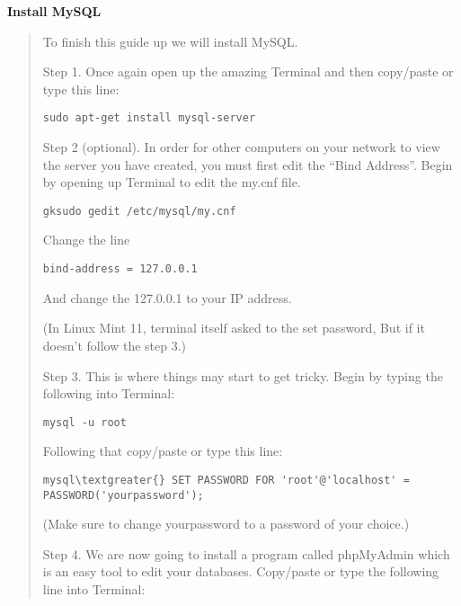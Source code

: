 \documentclass[letterpaper,10pt,english]{sphinxmanual}
\begin{document}
\textbf{Install MySQL}
\begin{quote}

To finish this guide up we will install MySQL.

Step 1. Once again open up the amazing Terminal and then copy/paste or type this line:

\begin{Verbatim}[commandchars=\\\{\}]
sudo apt-get install mysql-server
\end{Verbatim}

Step 2 (optional). In order for other computers on your network to view the server you have created, you must first
edit the ``Bind Address''. Begin by opening up Terminal to edit the my.cnf file.

\begin{Verbatim}[commandchars=\\\{\}]
gksudo gedit /etc/mysql/my.cnf
\end{Verbatim}

Change the line

\begin{Verbatim}[commandchars=\\\{\}]
bind-address = 127.0.0.1
\end{Verbatim}

And change the 127.0.0.1 to your IP address.

(In Linux Mint 11, terminal itself asked to the set password, But if it doesn't follow the step 3.)

Step 3. This is where things may start to get tricky. Begin by typing the following into Terminal:

\begin{Verbatim}[commandchars=\\\{\}]
mysql -u root
\end{Verbatim}

Following that copy/paste or type this line:

\begin{Verbatim}[commandchars=\\\{\}]
mysql\textgreater{} SET PASSWORD FOR 'root'@'localhost' = PASSWORD('yourpassword');
\end{Verbatim}

(Make sure to change yourpassword to a password of your choice.)

Step 4. We are now going to install a program called phpMyAdmin which is an easy tool
to edit your databases. Copy/paste or type the following line into Terminal:


\end{quote}
\end{document}
